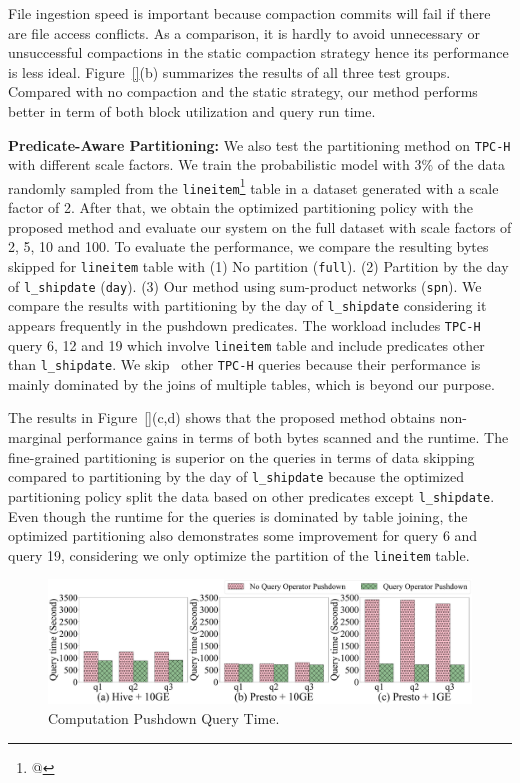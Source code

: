 File ingestion speed is important because compaction commits will fail if there are file access conflicts. As a comparison, it is hardly to avoid unnecessary or unsuccessful compactions in the static compaction strategy hence its performance is less ideal. Figure~\ref{}(b) summarizes the results of all three test groups. Compared with no compaction and the static  strategy, our method performs better in term of both block utilization and query run time.


\noindent \textbf{Predicate-Aware Partitioning:} We also test the partitioning method on \texttt{TPC-H}  with different scale factors. We train the probabilistic model with 3\% of the data randomly sampled from the \texttt{lineitem}\footnote{@} table in a dataset generated with a scale factor of 2. After that, we obtain the optimized partitioning policy with the proposed method and evaluate our system on the full dataset with scale factors of 2, 5, 10 and 100. To evaluate the performance, we compare the resulting bytes skipped for \texttt{lineitem} table with (1) No partition (\texttt{full}). (2) Partition by the day of \texttt{l\_shipdate} (\texttt{day}).  (3) Our  method using sum-product networks (\texttt{spn}).
 We compare the results with partitioning by the day of \texttt{l\_shipdate} considering it appears frequently in the pushdown predicates. The workload includes \texttt{TPC-H} query 6, 12 and 19 which involve \texttt{lineitem} table and include predicates other than \texttt{l\_shipdate}. We skip \ other \texttt{TPC-H} queries because their performance is  mainly dominated by the joins of multiple tables, which is beyond our purpose.
 

The results  in Figure~\ref{}(c,d) shows that the proposed method obtains non-marginal performance gains in terms of both bytes scanned and the runtime. The fine-grained partitioning is superior on the queries in terms of data skipping compared to partitioning by the day of \texttt{l\_shipdate} because the optimized partitioning policy split the data based on other predicates except \texttt{l\_shipdate}. 
Even though the runtime for the queries is dominated by table joining, the optimized partitioning also demonstrates some improvement for query 6 and query 19, considering we only optimize the partition of the \texttt{lineitem} table. 




\begin{figure}
	\centering
	\includegraphics[width=\columnwidth]{figures/Querytime}
	\caption{Computation Pushdown Query Time.}
	\label{fig:pushdown}
\end{figure}


